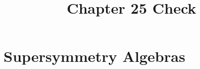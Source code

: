 \documentclass[11pt,a4paper]{article}
\title{Chapter 25 Check}
\author{}
\numberwithin{equation}{subsection}
\begin{document}
\maketitle
\setcounter{section}{24}
\section{Supersymmetry Algebras}







\end{document}
